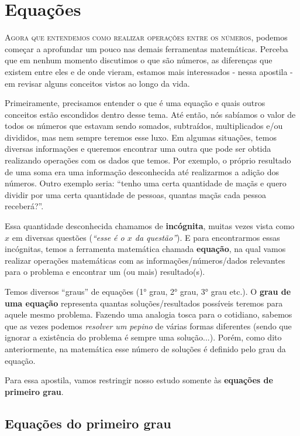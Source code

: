 \chapter{Equações}
\label{equacoes}

\lettrine{A}{gora que entendemos como realizar operações entre os números}, podemos começar a aprofundar um pouco nas demais ferramentas matemáticas. Perceba que em nenhum momento discutimos o que são números, as diferenças que existem entre eles e de onde vieram, estamos mais interessados - nessa apostila - em revisar alguns conceitos vistos ao longo da vida. 

Primeiramente, precisamos entender o que é uma equação e quais outros conceitos estão escondidos dentro desse tema. Até então, nós sabíamos o valor de todos os números que estavam sendo somados, subtraídos, multiplicados e/ou divididos, mas nem sempre teremos esse luxo. Em algumas situações, temos diversas informações e queremos encontrar uma outra que pode ser obtida realizando operações com os dados que temos. Por exemplo, o próprio resultado de uma soma era uma informação desconhecida até realizarmos a adição dos números. Outro exemplo seria: “tenho uma certa quantidade de maçãs e quero dividir por uma certa quantidade de pessoas, quantas maçãs cada pessoa receberá?”. 

Essa quantidade desconhecida chamamos de \textbf{incógnita}, muitas vezes vista como \textbf{$x$} em diversas questões (\textit{“esse é o $x$ da questão”}). E para encontrarmos essas incógnitas, temos a ferramenta matemática chamada \textbf{equação}, na qual vamos realizar operações matemáticas com as informações/números/dados relevantes para o problema e encontrar um (ou mais) resultado(s).

Temos diversos “graus” de equações (1° grau, 2° grau, 3° grau etc.). O \textbf{grau de uma equação} representa quantas soluções/resultados possíveis teremos para aquele mesmo problema. Fazendo uma analogia tosca para o cotidiano, sabemos que as vezes podemos \textit{resolver um pepino} de várias formas diferentes (sendo que ignorar a existência do problema é sempre uma solução...). Porém, como dito anteriormente, na matemática esse número de soluções é definido pelo grau da equação.

Para essa apostila, vamos restringir nosso estudo somente às \textbf{equações de primeiro grau}.



\section{Equações do primeiro grau}

